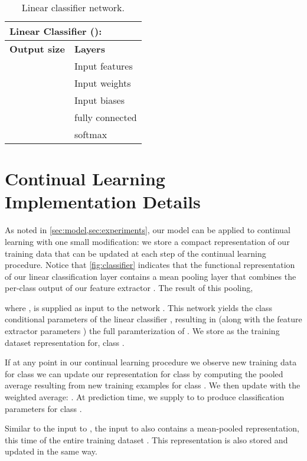 \documentclass{article}
\theoremstyle{definition}
\begin{document}
\begin{table}[h]
    \caption{Linear classifier network.}
	\centering
	\begin{tabular}{ll}
		\multicolumn{2}{l}{\textbf{Linear Classifier ():} } \\
 		\toprule
        \textbf{Output size} & \textbf{Layers} \\
        \midrule
		 & Input features  \\
		 & Input weights  \\
		 & Input biases  \\
		 & fully connected \\
		 & softmax \\ 
		\bottomrule
	\end{tabular}
	\label{table:linear_classifier}
\end{table}


\clearpage
\newpage

\section{Continual Learning Implementation Details}
\label{app:additional_continual_learning_details}

As noted in \cref{sec:model,sec:experiments}, our model can be applied to continual learning with one small modification: we store a compact representation of our training data that can be updated at each step of the continual learning procedure. Notice that \cref{fig:classifier} indicates that the functional representation of our linear classification layer  contains a mean pooling layer that combines the per-class output of our feature extractor . The result of this pooling, 

where , is supplied as input to the network . This network yields the class conditional parameters of the linear classifier , resulting in (along with the feature extractor parameters ) the full paramterization of . We store  as the training dataset representation for, class . 

If at any point in our continual learning procedure we observe new training data for class  we can update our representation for class  by computing 
 the pooled average resulting from  new training examples  for class . We then update  with the weighted average:
. At prediction time, we supply  to  to produce classification parameters for class . 

Similar to the input to , the input to  also contains a mean-pooled representation, this time of the entire training dataset . This representation is also stored and updated in the same way.
\end{document}
